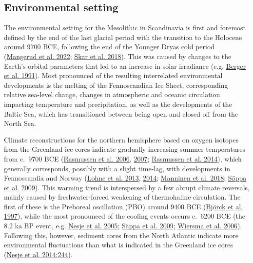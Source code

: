 \documentclass[
  a4paper,
  oneside]{uiophdthesis}
\begin{document}
\hypertarget{environmental-setting}{%
\subsection{Environmental setting}\label{environmental-setting}}

The environmental setting for the Mesolithic in Scandinavia is first and foremost defined by the end of the last glacial period with the transition to the Holocene around 9700 BCE, following the end of the Younger Dryas cold period (\protect\hyperlink{ref-mangerud2022}{Mangerud et al. 2022}; \protect\hyperlink{ref-skar2018}{Skar et al. 2018}). This was caused by changes to the Earth's orbital parameters that led to an increase in solar irradiance (e.g. \protect\hyperlink{ref-berger1991}{Berger et al. 1991}). Most pronounced of the resulting interrelated environmental developments is the melting of the Fennoscandian Ice Sheet, corresponding relative sea-level change, changes in atmospheric and oceanic circulation impacting temperature and precipitation, as well as the developments of the Baltic Sea, which has transitioned between being open and closed off from the North Sea.

Climate reconstructions for the northern hemisphere based on oxygen isotopes from the Greenland ice cores indicate gradually increasing summer temperatures from c.~9700 BCE (\protect\hyperlink{ref-rasmussen2006}{Rasmussen et al. 2006}, \protect\hyperlink{ref-rasmussen2007}{2007}; \protect\hyperlink{ref-rasmussen2014}{Rasmussen et al. 2014}), which generally corresponds, possibly with a slight time-lag, with developments in Fennoscandia and Norway (\protect\hyperlink{ref-lohne2013}{Lohne et al. 2013}, \protect\hyperlink{ref-lohne2014}{2014}; \protect\hyperlink{ref-manninen2018}{Manninen et al. 2018}; \protect\hyperlink{ref-seppa2009}{Säppa et al. 2009}). This warming trend is interspersed by a few abrupt climate reversals, mainly caused by freshwater-forced weakening of thermohaline circulation. The first of these is the Preboreal oscillation (PBO) around 9400 BCE (\protect\hyperlink{ref-bjorck1997}{Björck et al. 1997}), while the most pronounced of the cooling events occurs c.~6200 BCE (the 8.2 ka BP event, e.g. \protect\hyperlink{ref-nesje2005}{Nesje et al. 2005}; \protect\hyperlink{ref-seppa2009}{Säppa et al. 2009}; \protect\hyperlink{ref-wiersma2006}{Wiersma et al. 2006}). Following this, however, sediment cores from the North Atlantic indicate more environmental fluctuations than what is indicated in the Greenland ice cores (\protect\hyperlink{ref-nesje2014}{Nesje et al. 2014:244}).
\end{document}
